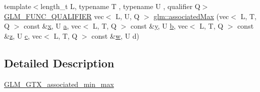 \begin{DoxyCompactItemize}
\item 
{\footnotesize template$<$length\+\_\+t L, typename T , typename U , qualifier Q$>$ }\\\mbox{\hyperlink{setup_8hpp_a33fdea6f91c5f834105f7415e2a64407}{G\+L\+M\+\_\+\+F\+U\+N\+C\+\_\+\+Q\+U\+A\+L\+I\+F\+I\+ER}} vec$<$ L, U, Q $>$ \mbox{\hyperlink{group__gtx__associated__min__max_gab9c3dd74cac899d2c625b5767ea3b3fb}{glm\+::associated\+Max}} (vec$<$ L, T, Q $>$ const \&\mbox{\hyperlink{_s_d_l__opengl_8h_ad0e63d0edcdbd3d79554076bf309fd47}{x}}, U \mbox{\hyperlink{_s_d_l__opengl__glext_8h_a3309789fc188587d666cda5ece79cf82}{a}}, vec$<$ L, T, Q $>$ const \&\mbox{\hyperlink{_s_d_l__opengl_8h_a1675d9d7bb68e1657ff028643b4037e3}{y}}, U \mbox{\hyperlink{_s_d_l__opengl__glext_8h_a0f71581a41fd2264c8944126dabbd010}{b}}, vec$<$ L, T, Q $>$ const \&\mbox{\hyperlink{_s_d_l__opengl__glext_8h_a5e74030ebb3297ce1b37ff716fedd68f}{z}}, U \mbox{\hyperlink{_s_d_l__opengl__glext_8h_a1f2d7f8147412c43ba2303a56f97ee73}{c}}, vec$<$ L, T, Q $>$ const \&\mbox{\hyperlink{_s_d_l__opengl__glext_8h_a6ee8f168a7ab6785a9bb57c6715dad99}{w}}, U d)
\end{DoxyCompactItemize}


\subsection{Detailed Description}
\mbox{\hyperlink{group__gtx__associated__min__max}{G\+L\+M\+\_\+\+G\+T\+X\+\_\+associated\+\_\+min\+\_\+max}} 